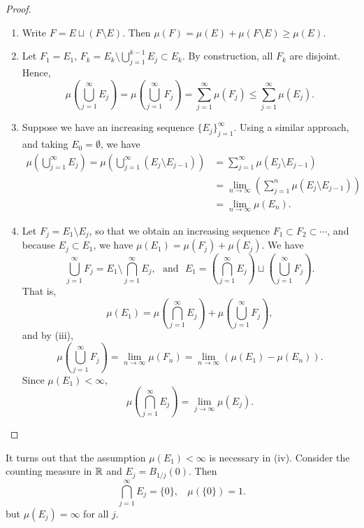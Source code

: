 \documentclass[12pt]{article} %
\begin{document}
\begin{proof}
    \begin{enumerate}
        \item Write $F = E \sqcup (F \setminus E)$. Then $\mu(F) = \mu(E) + \mu(F \setminus E) \geq \mu(E)$.
        \item Let $F_1 = E_1$, $F_k = E_k \setminus \bigcup_{j=1}^{k-1} E_j \subset E_k$. By construction, all $F_k$ are disjoint. Hence, \[\mu\left(\bigcup_{j=1}^{\infty} E_j \right) = \mu\left(\bigcup_{j=1}^{\infty} F_j \right) = \sum_{j=1}^{\infty} \mu(F_j) \leq \sum_{j=1}^{\infty} \mu(E_j).\]
        \item Suppose we have an increasing sequence $\{E_j\}_{j=1}^{\infty}$. Using a similar approach, and taking $E_0 = \emptyset$, we have \begin{align*}
            \mu\left(\bigcup_{j=1}^{\infty} E_j \right) = \mu\left(\bigcup_{j=1}^{\infty}\left(E_j \setminus E_{j-1}\right) \right) &= \sum_{j=1}^{\infty} \mu(E_j \setminus E_{j-1}) \\
            &= \lim_{n \to \infty} \left(\sum_{j=1}^{n} \mu(E_j \setminus E_{j-1})\right)\\
            &= \lim_{n\to \infty} \mu(E_n).
        \end{align*}
        \item Let $F_j = E_1 \setminus E_j$, so that we obtain an increasing sequence $F_1 \subset F_2 \subset \cdots$, and because $E_j \subset E_1$, we have $\mu(E_1) = \mu(F_j) + \mu(E_j)$. We have \[\bigcup_{j=1}^{\infty} F_j = E_1 \setminus \bigcap_{j=1}^{\infty} E_j, \ \ \ \text{and} \ \ \ E_1 = \left(\bigcap_{j=1}^{\infty} E_j\right) \sqcup \left(\bigcup_{j=1}^{\infty} F_j\right).\] That is, \[\mu(E_1) = \mu\left(\bigcap_{j=1}^{\infty} E_j \right) + \mu\left(\bigcup_{j=1}^{\infty} F_j \right),\] and by (iii), \[\mu\left(\bigcup_{j=1}^{\infty} F_j \right) = \lim_{n\to \infty} \mu(F_n) = \lim_{n \to
        \infty} (\mu(E_1) - \mu(E_n)).\] Since $\mu(E_1) < \infty$, \[\mu\left(\bigcap_{j=1}^{\infty} E_j \right) = \lim_{j\to \infty} \mu(E_j).\]
    \end{enumerate}
\end{proof}

\begin{remark}
    It turns out that the assumption $\mu(E_1) < \infty$ is necessary in (iv). Consider the counting measure in $\mathbb{R}$ and $E_j = B_{1/j}(0)$. Then \[\bigcap_{j=1}^{\infty} E_j = \{0\}, \ \ \ \ \mu(\{0\}) = 1.\] but $\mu(E_j) = \infty$ for all $j$.
\end{remark}
\end{document}

